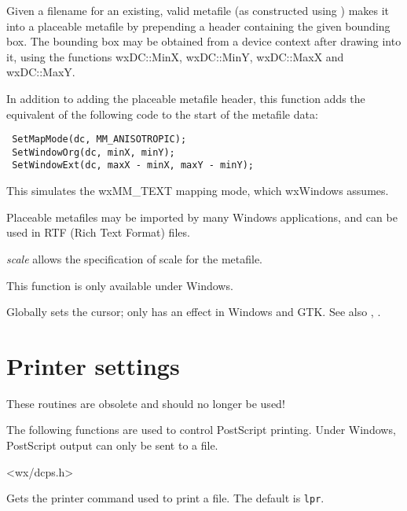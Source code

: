 Given a filename for an existing, valid metafile (as constructed using )
makes it into a placeable metafile by prepending a header containing the given
bounding box. The bounding box may be obtained from a device context after drawing
into it, using the functions wxDC::MinX, wxDC::MinY, wxDC::MaxX and wxDC::MaxY.

In addition to adding the placeable metafile header, this function adds
the equivalent of the following code to the start of the metafile data:

\begin{verbatim}
 SetMapMode(dc, MM_ANISOTROPIC);
 SetWindowOrg(dc, minX, minY);
 SetWindowExt(dc, maxX - minX, maxY - minY);
\end{verbatim}

This simulates the wxMM\_TEXT mapping mode, which wxWindows assumes.

Placeable metafiles may be imported by many Windows applications, and can be
used in RTF (Rich Text Format) files.

{\it scale} allows the specification of scale for the metafile.

This function is only available under Windows.

\label{wxsetcursor}


Globally sets the cursor; only has an effect in Windows and GTK.
See also , .

\section{Printer settings}\label{printersettings}

These routines are obsolete and should no longer be used!

The following functions are used to control PostScript printing. Under
Windows, PostScript output can only be sent to a file.


<wx/dcps.h>



Gets the printer command used to print a file. The default is {\tt lpr}.


